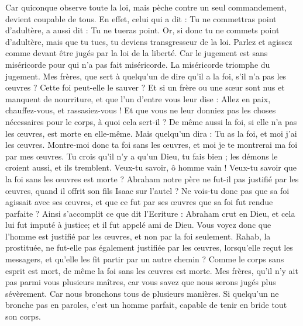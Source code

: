 \begin{multicols}{2}
Car quiconque observe toute la loi, mais pèche contre un seul commandement, devient coupable de tous.
En effet, celui qui a dit : Tu ne commettras point d’adultère, a aussi dit : Tu ne tueras point. Or, si donc tu ne commets point d’adultère{}, mais que tu tues, tu deviens transgresseur de la loi.
Parlez et agissez comme devant être jugés par la loi de la liberté.
Car le jugement est sans miséricorde pour qui n’a pas fait miséricorde{}. La miséricorde triomphe du jugement.
Mes frères, que sert à quelqu'un de dire qu'il a la foi, s’il n’a pas les œuvres ? Cette foi peut-elle le sauver ?
Et si un frère ou une sœur sont nus et manquent de nourriture,
et que l’un d'entre vous leur dise : Allez en paix, chauffez-vous, et rassasiez-vous ! Et que vous ne leur donniez pas les choses nécessaires pour le corps, à quoi cela sert-il ?
De même aussi la foi, si elle n'a pas les œuvres, est morte en elle-même.
Mais quelqu'un dira : Tu as la foi, et moi j'ai les œuvres. Montre-moi donc ta foi sans les œuvres, et moi je te montrerai ma foi par mes œuvres.
Tu crois qu'il n'y a qu'un Dieu, tu fais bien ; les démons le croient aussi, et ils tremblent.
Veux-tu savoir, ô homme vain ! Veux-tu savoir que la foi sans les œuvres est morte ?
Abraham notre père ne fut-il pas justifié par les œuvres, quand il offrit son fils Isaac sur l'autel ?
Ne vois-tu donc pas que sa foi agissait avec ses œuvres, et que ce fut par ses œuvres que sa foi fut rendue parfaite ?
Ainsi s’accomplit ce que dit l’Ecriture : Abraham crut en Dieu, et cela lui fut imputé à justice{}; et il fut appelé ami de Dieu.
Vous voyez donc que l'homme est justifié par les œuvres, et non par la foi seulement.
Rahab, la prostituée, ne fut-elle pas également justifiée par les œuvres, lorsqu’elle reçut les messagers, et qu'elle les fit partir par un autre chemin{} ?
Comme le corps sans esprit est mort, de même la foi sans les œuvres est morte.
\VerseOne{}Mes frères, qu’il n’y ait pas parmi vous plusieurs maîtres{}, car vous savez que nous serons jugés plus sévèrement.
Car nous bronchons tous de plusieurs manières. Si quelqu'un ne bronche pas en paroles, c’est un homme parfait, capable de tenir en bride tout son corps.

\end{multicols}
